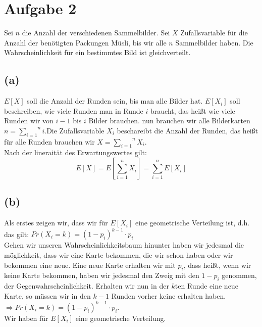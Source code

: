 \documentclass[11pt,a4paper,ngerman]{article}
\begin{document}

\section*{Aufgabe 2}

Sei $n$ die Anzahl der verschiedenen Sammelbilder. Sei $X$ Zufallsvariable für die Anzahl der benötigten Packungen Müsli, bis wir alle $n$ Sammelbilder haben. Die Wahrscheinlichkeit für ein bestimmtes Bild ist gleichverteilt.


\subsection*{(a)}

$E[X]$ soll die Anzahl der Runden sein, bis man alle Bilder hat. $E[ X_i ]$ soll beschreiben, wie viele Runden man in Runde $i$ braucht, das heißt wie viele Runden wir von $i-1$ bis $i$ Bilder brauchen. nun brauchen wir alle Bilderkarten $n = \overset{n}{\underset{i=1}{\sum}} i$.Die Zufallsvariable $X_i$ beschareibt die Anzahl der Runden, das heißt für alle Runden brauchen wir $X = \overset{n}{\underset{i=1}{\sum}} X_i$.\\
Nach der lineraität des Erwartungswertes gilt:\\
$$E[ X ] = E \left[ \sum_{i=1}^{n} X_i \right] = \sum_{i=1}^{n} E[ X_i ]$$




\subsection*{(b)}

Als erstes zeigen wir, dass wir für $E[X_i]$ eine geometrische Verteilung ist, d.h. das gilt:
$Pr(X_i = k) = (1 - p_i)^{k-1}\cdot p_i$ \\

Gehen wir unseren Wahrscheinlichkeitsbaum hinunter haben wir jedesmal die möglichkeit, dass wir eine Karte bekommen, die wir schon haben oder wir bekommen eine neue. Eine neue Karte erhalten wir mit $p_i$, dass heißt, wenn wir keine Karte bekommen, haben wir jedesmal den Zweig mit den $1-p_i$ genommen, der Gegenwahrscheinlichkeit. Erhalten wir nun in der $k$ten Runde eine neue Karte, so müssen wir in den $k-1$ Runden vorher keine erhalten haben. $\Rightarrow Pr(X_i = k) = (1-p_i)^{k-1} \cdot p_i$.\\
Wir haben für $E[X_i]$ eine geometrische Verteilung.
\end{document}
